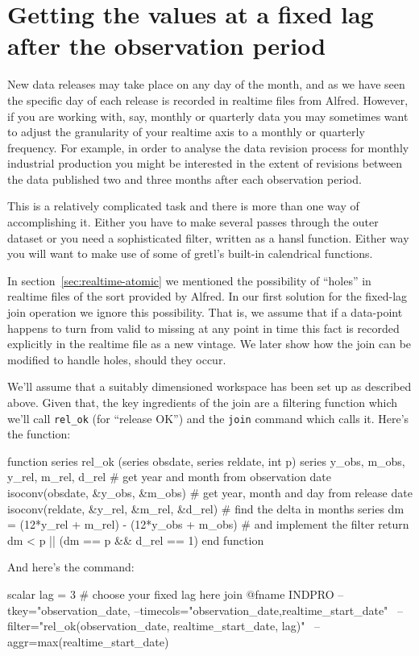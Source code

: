 \section{Getting the values at a fixed lag after the observation
  period}
\label{sec:realtime-fixed-lag}

New data releases may take place on any day of the month, and as we
have seen the specific day of each release is recorded in realtime
files from Alfred. However, if you are working with, say, monthly or
quarterly data you may sometimes want to adjust the granularity of
your realtime axis to a monthly or quarterly frequency. For example,
in order to analyse the data revision process for monthly industrial
production you might be interested in the extent of revisions between
the data published two and three months after each observation period.

This is a relatively complicated task and there is more than one way
of accomplishing it. Either you have to make several passes through
the outer dataset or you need a sophisticated filter, written as a
hansl function. Either way you will want to make use of some of
gretl's built-in calendrical functions.

In section~\ref{sec:realtime-atomic} we mentioned the possibility of
``holes'' in realtime files of the sort provided by Alfred. In our
first solution for the fixed-lag join operation we ignore this
possibility. That is, we assume that if a data-point happens to turn
from valid to missing at any point in time this fact is recorded
explicitly in the realtime file as a new vintage. We later show how
the join can be modified to handle holes, should they occur.

We'll assume that a suitably dimensioned workspace has been set up as
described above. Given that, the key ingredients of the join are a
filtering function which we'll call \verb|rel_ok| (for ``release OK'')
and the \texttt{join} command which calls it. Here's the function:
%
\begin{code}
function series rel_ok (series obsdate, series reldate, int p)
  series y_obs, m_obs, y_rel, m_rel, d_rel
  # get year and month from observation date
  isoconv(obsdate, &y_obs, &m_obs)
  # get year, month and day from release date
  isoconv(reldate, &y_rel, &m_rel, &d_rel)
  # find the delta in months
  series dm = (12*y_rel + m_rel) - (12*y_obs + m_obs)
  # and implement the filter
  return dm < p || (dm == p && d_rel == 1)
end function
\end{code}
%
And here's the command:
%
\begin{code}
scalar lag = 3  # choose your fixed lag here
join @fname INDPRO --tkey="observation_date,%
--timecols="observation_date,realtime_start_date" \
--filter="rel_ok(observation_date, realtime_start_date, lag)" \
--aggr=max(realtime_start_date)
\end{code}

